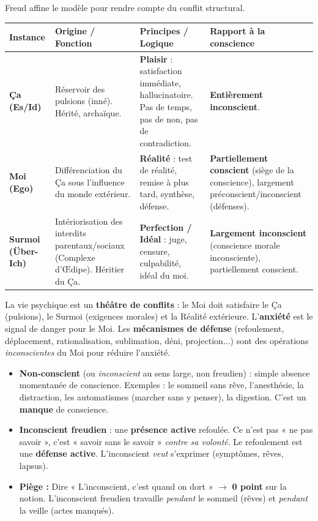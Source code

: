 \documentclass[11pt]{article}
\newcounter{popsec}
\newcounter{popsub}
\newcommand{\courssub}[1]{%
  \stepcounter{popsub}%
  \par\vspace{9pt}\noindent{\popxbold\fontsize{11.5}{13}\selectfont\color{popink}{\color{poporange}\thepopsec.\thepopsub}\hspace{6pt}#1}\par\nopagebreak\vspace{4pt}
}
\begin{document}
\courssub{La seconde topique (1923) : Moi / Ça / Surmoi}

Freud affine le modèle pour rendre compte du conflit structural.

\begin{center}
\begin{tabularx}{\linewidth}{|l|X|X|X|}\hline
\rowcolor{popblueL}
\textbf{Instance} & \textbf{Origine / Fonction} & \textbf{Principes / Logique} & \textbf{Rapport à la conscience} \\ \hline
\textbf{Ça (Es/Id)} & Réservoir des pulsions (inné). Hérité, archaïque. & \textbf{Plaisir} : satisfaction immédiate, hallucinatoire. Pas de temps, pas de non, pas de contradiction. & \textbf{Entièrement inconscient}. \\ \hline
\textbf{Moi (Ego)} & Différenciation du Ça sous l'influence du monde extérieur. & \textbf{Réalité} : test de réalité, remise à plus tard, synthèse, défense. & \textbf{Partiellement conscient} (siège de la conscience), largement préconscient/inconscient (défenses). \\ \hline
\textbf{Surmoi (Über-Ich)} & Intériorisation des interdits parentaux/sociaux (Complexe d'Œdipe). Héritier du Ça. & \textbf{Perfection / Idéal} : juge, censure, culpabilité, idéal du moi. & \textbf{Largement inconscient} (conscience morale inconsciente), partiellement conscient. \\ \hline
\end{tabularx}
\end{center}

\begin{aretenir}
La vie psychique est un \textbf{théâtre de conflits} : le Moi doit satisfaire le Ça (pulsions), le Surmoi (exigences morales) et la Réalité extérieure. L'\textbf{anxiété} est le signal de danger pour le Moi. Les \textbf{mécanismes de défense} (refoulement, déplacement, rationalisation, sublimation, déni, projection...) sont des opérations \emph{inconscientes} du Moi pour réduire l'anxiété.
\end{aretenir}

\begin{attention}
\begin{itemize}
    \item \textbf{Non-conscient} (ou \emph{inconscient} au sens large, non freudien) : simple absence momentanée de conscience. Exemples : le sommeil sans rêve, l'anesthésie, la distraction, les automatismes (marcher sans y penser), la digestion. C'est un \textbf{manque} de conscience.
    \item \textbf{Inconscient freudien} : une \textbf{présence active} refoulée. Ce n'est pas « ne pas savoir », c'est « savoir sans le savoir » \emph{contre sa volonté}. Le refoulement est une \textbf{défense active}. L'inconscient \emph{veut} s'exprimer (symptômes, rêves, lapsus).
    \item \textbf{Piège :} Dire « L'inconscient, c'est quand on dort » $\to$ \textbf{0 point} sur la notion. L'inconscient freudien travaille \emph{pendant} le sommeil (rêves) et \emph{pendant} la veille (actes manqués).
\end{itemize}
\end{attention}
\end{document}
